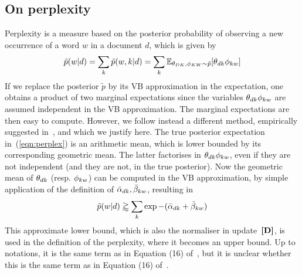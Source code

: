 \subsection{On perplexity}
Perplexity is a measure based on the posterior probability of observing a new occurrence of a word $w$ in a document $d$, which is given by
\begin{equation}
\label{eqn:perplex}
\tilde{p}(w|d) =
\sum_k\tilde{p}(w,k|d) =
\sum_k\mathbb{E}_{\theta_{DK},\phi_{KW}\sim\tilde{p}}[\theta_{dk}\phi_{kw}]
\end{equation}
If we replace the posterior $\tilde{p}$ by its VB approximation in the expectation, one obtains a product of two marginal expectations since the variables $\theta_{dk}\phi_{kw}$ are assumed independent in the VB approximation. The marginal expectations are then easy to compute. However, we follow instead a different method, empirically suggested in~\cite{asuncion_smoothing_2009}, and which we justify here. The true posterior expectation in~(\ref{eqn:perplex}) is an arithmetic mean, which is lower bounded by its corresponding geometric mean. The latter factorises in $\theta_{dk}\phi_{kw}$, even if they are not independent (and they are not, in the true posterior). Now the geometric mean of $\theta_{dk}$ (resp. $\phi_{kw}$) can be computed in the VB approximation, by simple application of the definition of $\bar{\alpha}_{dk},\bar{\beta}_{kw}$, resulting in
\begin{equation*}
\tilde{p}(w|d) \gtrapprox \sum_k\exp-(\bar{\alpha}_{dk}+\bar{\beta}_{kw})
\end{equation*}
This approximate lower bound, which is also the normaliser in update~$\textbf{[D]}$, is used in the definition of the perplexity, where it becomes an upper bound. Up to notations, it is the same term as in Equation (16) of~\cite{asuncion_smoothing_2009}, but it is unclear whether this is the same term as in Equation (16) of~\cite{hoffman_online_2010}.